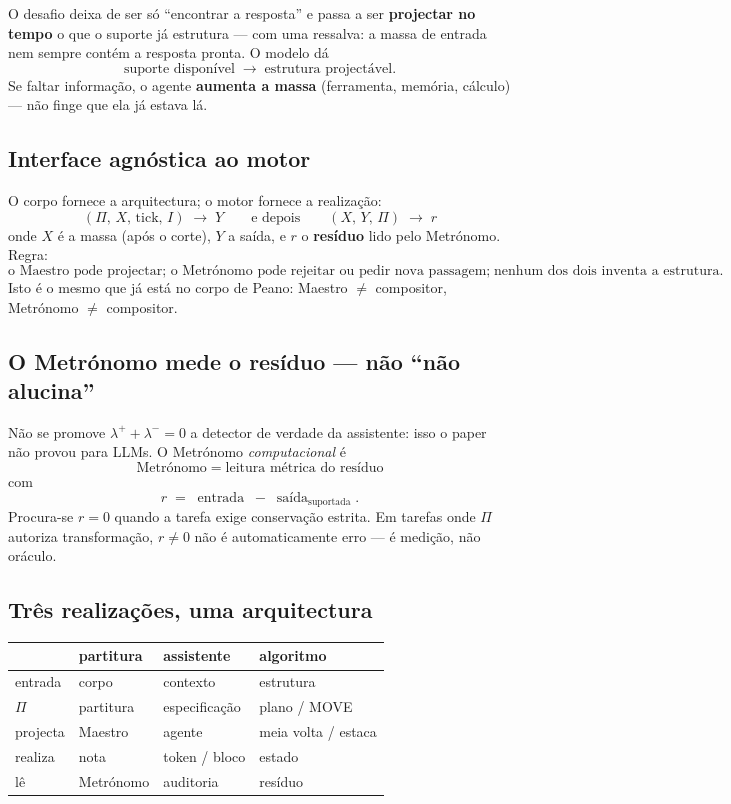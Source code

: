 \documentclass[11pt,a4paper]{article}
\begin{document}
\noindent O desafio deixa de ser só ``encontrar a resposta'' e passa a ser \textbf{projectar no
tempo} o que o suporte já estrutura --- com uma ressalva: a massa de entrada nem sempre contém a
resposta pronta. O modelo dá
\[
  \text{suporte disponível}
  \;\longrightarrow\;
  \text{estrutura projectável}.
\]
Se faltar informação, o agente \textbf{aumenta a massa} (ferramenta, memória, cálculo) --- não
finge que ela já estava lá.

\subsection*{Interface agnóstica ao motor}

O corpo fornece a arquitectura; o motor fornece a realização:
\[
\boxed{
(\Pi,\,X,\,\mathrm{tick},\,I)
\;\longrightarrow\;
Y
}
\qquad\text{e depois}\qquad
\boxed{
(X,\,Y,\,\Pi)
\;\longrightarrow\;
r
}
\]
onde $X$ é a massa (após o corte), $Y$ a saída, e $r$ o \textbf{resíduo} lido pelo Metrónomo.
Regra:
\[
\boxed{
\text{o Maestro pode projectar; o Metrónomo pode rejeitar ou pedir nova passagem;}
\;
\text{nenhum dos dois inventa a estrutura.}
}
\]
Isto é o mesmo que já está no corpo de Peano: Maestro $\neq$ compositor, Metrónomo $\neq$
compositor.

\subsection*{O Metrónomo mede o resíduo --- não ``não alucina''}

Não se promove $\lambda^{+}+\lambda^{-}=0$ a detector de verdade da assistente: isso o paper não
provou para LLMs. O Metrónomo \emph{computacional} é
\[
\boxed{
\text{Metrónomo}
\;=\;
\text{leitura métrica do resíduo}
}
\]
com
\[
  r
  \;=\;
  \operatorname{entrada}
  \;-\;
  \operatorname{saída}_{\mathrm{suportada}}.
\]
Procura-se $r=0$ quando a tarefa exige conservação estrita. Em tarefas onde $\Pi$ autoriza
transformação, $r\neq0$ não é automaticamente erro --- é medição, não oráculo.

\subsection*{Três realizações, uma arquitectura}

\begin{center}\small
\begin{tabular}{@{}llll@{}}
\toprule
 & partitura & assistente & algoritmo \\
\midrule
entrada & corpo & contexto & estrutura \\
$\Pi$ & partitura & especificação & plano / MOVE \\
projecta & Maestro & agente & meia volta / estaca \\
realiza & nota & token / bloco & estado \\
lê & Metrónomo & auditoria & resíduo \\
\bottomrule
\end{tabular}
\end{center}
\end{document}

